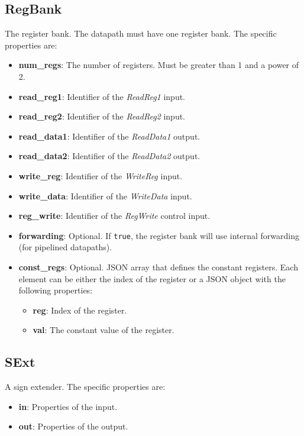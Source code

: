 \documentclass[11pt,a4paper,twoside,titlepage]{report}
\begin{document}
\subsection{RegBank}

The register bank. The datapath must have one register bank.
The specific properties are:
\begin{itemize}
	\item \textbf{num\_regs}: The number of registers. Must be greater than 1 and
		a power of 2.
	\item \textbf{read\_reg1}: Identifier of the \emph{ReadReg1} input.
	\item \textbf{read\_reg2}: Identifier of the \emph{ReadReg2} input.
	\item \textbf{read\_data1}: Identifier of the \emph{ReadData1} output.
	\item \textbf{read\_data2}: Identifier of the \emph{ReadData2} output.
	\item \textbf{write\_reg}: Identifier of the \emph{WriteReg} input.
	\item \textbf{write\_data}: Identifier of the \emph{WriteData} input.
	\item \textbf{reg\_write}: Identifier of the \emph{RegWrite} control input.
	\item \textbf{forwarding}: Optional. If \verb+true+, the register bank will use 
		internal forwarding (for pipelined datapaths).
	\item \textbf{const\_regs}: Optional. JSON array that defines the constant 
		registers. Each element can be either the index of the register or a JSON 
		object with the following properties:
		\begin{itemize}
			\item \textbf{reg}: Index of the register.
			\item \textbf{val}: The constant value of the register.
		\end{itemize}
\end{itemize}

\subsection{SExt}

A sign extender. The specific properties are:
\begin{itemize}
	\item \textbf{in}: Properties of the input.
	\item \textbf{out}: Properties of the output.
\end{itemize}
\end{document}
